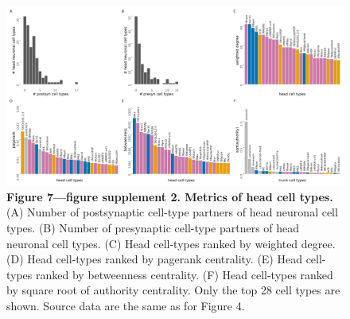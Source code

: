 \documentclass[
  11pt,
]{article}
\begin{document}
\begin{figure}[H]

{\centering \includegraphics[width=1\textwidth,height=\textheight]{Figures/Figure7_fig_suppl2.png}

}

\caption{\textbf{Figure 7---figure supplement 2. Metrics of head cell
types.} (A) Number of postsynaptic cell-type partners of head neuronal
cell types. (B) Number of presynaptic cell-type partners of head
neuronal cell types. (C) Head cell-types ranked by weighted degree. (D)
Head cell-types ranked by pagerank centrality. (E) Head cell-types
ranked by betweenness centrality. (F) Head cell-types ranked by square
root of authority centrality. Only the top 28 cell types are shown.
Source data are the same as for Figure 4.}

\end{figure}%
\end{document}

